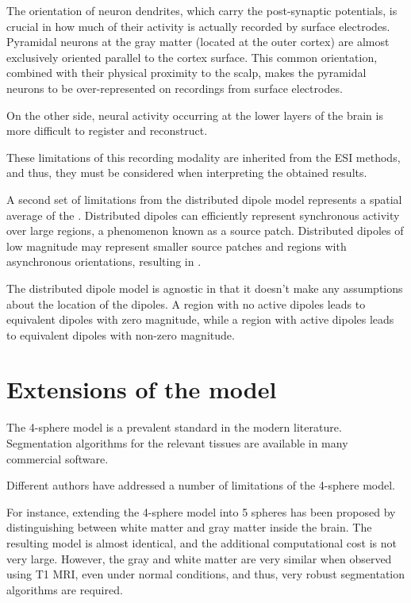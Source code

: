 The orientation of neuron dendrites, which carry the post-synaptic potentials, is crucial in how much of their activity is actually recorded by surface electrodes.
%
Pyramidal neurons at the gray matter (located at the outer cortex) are almost exclusively oriented parallel to the cortex surface.
%
This common orientation, combined with their physical proximity to the scalp, makes the pyramidal neurons to be over-represented on recordings from surface electrodes.

On the other side, neural activity occurring at the lower layers of the brain is more difficult to register and reconstruct.

These limitations of this recording modality are inherited from the ESI methods, and thus, they must be considered when interpreting the obtained results.

A second set of limitations from the distributed dipole model represents a spatial average of the .
%
Distributed dipoles can efficiently represent synchronous activity over large regions, a phenomenon known as a source patch.
%
Distributed dipoles of low magnitude may represent smaller source patches and regions with asynchronous orientations, resulting in .




%
The distributed dipole model is agnostic in that it doesn't make any assumptions about the location of the dipoles.
%
A region with no active dipoles leads to equivalent dipoles with zero magnitude, while a region with active dipoles leads to equivalent dipoles with non-zero magnitude.

\section{Extensions of the model}

The 4-sphere model is a prevalent standard in the modern literature.
%
Segmentation algorithms for the relevant tissues are available in many commercial software.

Different authors have addressed a number of limitations of the 4-sphere model.

For instance, extending the 4-sphere model into 5 spheres has been proposed by distinguishing between white matter and gray matter inside the brain.
%
The resulting model is almost identical, and the additional computational cost is not very large. 
%
However, the gray and white matter are very similar when observed using T1 MRI, even under normal conditions, and thus, very robust segmentation algorithms are required.


